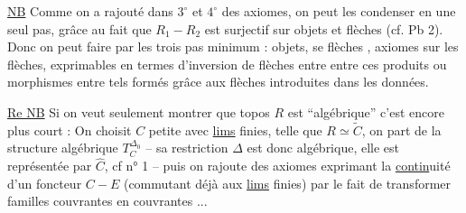 
\uline{NB} Comme on a rajouté dans $3^\circ$ et $4^\circ$ des axiomes, on peut les condenser en une seul pas, grâce au fait que $R_1-R_2$ est surjectif sur objets et flèches (cf. Pb 2). Donc on peut  faire par les trois pas minimum : objets, se  flèches , axiomes sur les flèches, exprimables en termes  d'inversion de flèches entre    entre ces produits   ou morphismes entre tels formés grâce aux flèches introduites dans les données.



\uline{Re NB} Si on veut seulement montrer que  topos $R$ est ``algébrique'' c'est encore plus court : On choisit $C$ petite avec \uline{lims} finies, telle que $R\simeq\widetilde C$,  on  part de la structure algébrique $T_C^{\Delta{}_0}$ -- sa restriction \unsure{,} $\Delta$ est donc algébrique, elle est représentée par $\widehat C$, cf  n° 1 -- puis on rajoute des axiomes exprimant la \uline{contin}uité d'un foncteur $C-E$ (commutant déjà aux \uline{lims} finies) par le fait de transformer familles couvrantes en  couvrantes ...

